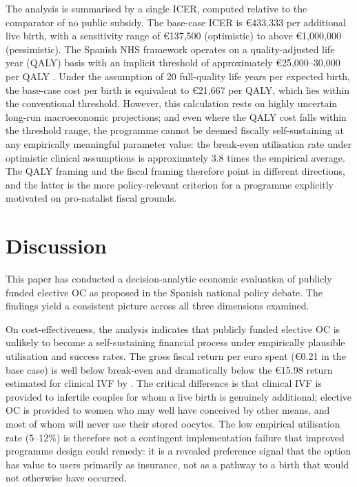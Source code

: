 \documentclass[12pt,a4paper]{article}
\begin{document}
The analysis is summarised by a single ICER, computed relative to the
comparator of no public subsidy. The base-case ICER is \euro{}433,333
per additional live birth, with a sensitivity range of \euro{}137,500
(optimistic) to above \euro{}1,000,000 (pessimistic). The Spanish NHS
framework operates on a quality-adjusted life year (QALY) basis with an
implicit threshold of approximately \euro{}25,000--30,000 per QALY
\citep{vallejotorres2018}. Under the assumption of 20 full-quality life
years per expected birth, the base-case cost per birth is equivalent to
\euro{}21,667 per QALY, which lies within the conventional threshold.
However, this calculation rests on highly uncertain long-run
macroeconomic projections; and even where the QALY cost falls within
the threshold range, the programme cannot be deemed fiscally
self-sustaining at any empirically meaningful parameter value: the
break-even utilisation rate under optimistic clinical assumptions is
approximately 3.8 times the empirical average. The QALY framing and
the fiscal framing therefore point in different directions, and the
latter is the more policy-relevant criterion for a programme explicitly
motivated on pro-natalist fiscal grounds.

\section{Discussion}\label{sec:discussion}

This paper has conducted a decision-analytic economic evaluation of
publicly funded elective OC as proposed in the Spanish national policy
debate. The findings yield a consistent picture across all three
dimensions examined.

On cost-effectiveness, the analysis indicates that publicly funded
elective OC is unlikely to become a self-sustaining financial process
under empirically plausible utilisation and success rates. The gross
fiscal return per euro spent (\euro{}0.21 in the base case) is well
below break-even and dramatically below the \euro{}15.98 return
estimated for clinical IVF by \citet{matorras2016}. The critical
difference is that clinical IVF is provided to infertile couples for
whom a live birth is genuinely additional; elective OC is provided to
women who may well have conceived by other means, and most of whom will
never use their stored oocytes. The low empirical utilisation rate
(5--12\%) is therefore not a contingent implementation failure that
improved programme design could remedy: it is a revealed preference
signal that the option has value to users primarily as insurance, not
as a pathway to a birth that would not otherwise have occurred.
\end{document}
